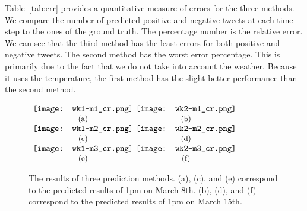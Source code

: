 Table~\ref{tab:err} provides a quantitative measure of errors for the three methods. We compare the number of predicted positive and negative tweets at each time step to the ones of the ground truth. The percentage number is the relative error. We can see that the third method has the least errors for both positive and negative tweets. The second method has the worst error percentage. This is primarily due to the fact that we do not take into account the weather. Because it uses the temperature, the first method has the slight better performance than the second method.

\begin{figure}[t]
\begin{center}
$\begin{array}{c@{\hspace{0.01\linewidth}}c}
\texttt{[image: wk1-m1\_cr.png]} &
\texttt{[image: wk2-m1\_cr.png]}
\\
\mbox{\small{(a)}} & \mbox{\small{(b)}}
\\
\texttt{[image: wk1-m2\_cr.png]} &
\texttt{[image: wk2-m2\_cr.png]}
\\
\mbox{\small{(c)}} & \mbox{\small{(d)}}
\\
\texttt{[image: wk1-m3\_cr.png]} &
\texttt{[image: wk2-m3\_cr.png]}
\\
\mbox{\small{(e)}} & \mbox{\small{(f)}}
\end{array}$
\end{center}
\vspace{-.1in}
\caption{The results of three prediction methods. (a), (c), and (e) correspond to the predicted results of 1pm on March 8th. (b), (d), and (f) correspond to the predicted results of 1pm on March 15th.}
\label{fig:predict}
\end{figure}

\begin{table}[t]
\caption{The percentage errors of three prediction methods.}
\begin{center}
\end{center}
\vspace{-.2in}
\label{tab:err}
\end{table}



